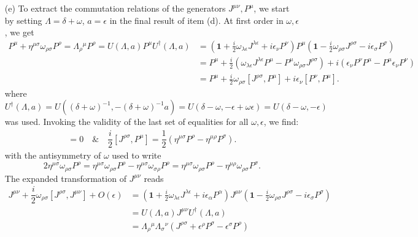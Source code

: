 \documentclass[10pt, a4paper]{article}
\begin{document}
\begin{enumerate}
  \item[(e)] To extract the commutation relations of the generators $J^{\mu \nu}, P^{\mu}$, we start by setting $\Lambda = \delta + \omega$, $a = \epsilon$ in the final result of item (d). At first order in $\omega, \epsilon$, we get
  \begin{align*}
    P^\mu + \eta^{\mu \sigma}\omega_{\rho \sigma} P^\rho = \Lambda_\rho{ }^\mu P^\rho = U(\Lambda, a) P^\mu U^{\dagger}(\Lambda, a) &= \left(\mathbf{1}+\frac{i}{2} \omega_{\lambda \epsilon} J^{\lambda \epsilon}+i \epsilon_\nu P^\nu\right) P^\mu \left(\mathbf{1}-\frac{i}{2} \omega_{\rho \sigma} J^{\rho \sigma}-i \epsilon_\sigma P^\sigma\right)\\
    &= P^\mu + \frac{i}{2} \left(\omega_{\lambda \epsilon} J^{\lambda \epsilon}P^{\mu} - P^{\mu} \omega_{\rho \sigma}  J^{\rho \sigma}\right)+i (\epsilon_\nu P^\nu P^\mu - P^\mu \epsilon_\nu P^\nu)\\
    &= P^\mu + \frac{i}{2} \omega_{\rho \sigma} [J^{\rho \sigma}, P^{\mu}]  +i \epsilon_\nu [P^{\nu}, P^{\mu}].
   \end{align*}
   where $U^{\dagger}(\Lambda, a) = U((\delta + \omega)^{-1}, -(\delta + \omega)^{-1} a) = U(\delta - \omega, -\epsilon + \omega \epsilon) = U(\delta - \omega, -\epsilon)$ was used. Invoking the validity of the last set of equalities for all $\omega, \epsilon$, we find: 
    \begin{align*}
      [P^{\nu}, P^{\mu}] = 0 \quad \& \quad \dfrac{i}{2}[J^{\rho \sigma}, P^{\mu}] =  \dfrac{1}{2}\left(\eta^{\mu \sigma}P^\rho- \eta^{\mu \rho} P^\sigma\right).
    \end{align*}
    with the antisymmetry of $\omega$ used to write $$2\eta^{\mu \sigma}\omega_{\rho \sigma} P^\rho = \eta^{\mu \sigma}\omega_{\rho \sigma} P^\rho - \eta^{\mu \sigma}\omega_{\sigma \rho} P^\rho = \eta^{\mu \sigma}\omega_{\rho \sigma} P^\rho - \eta^{\mu \rho}\omega_{\rho \sigma} P^\sigma. $$
    The expanded transformation of $J^{\mu\nu}$ reads 
    \begin{align*}
      J^{\mu \nu} + \dfrac{i}{2} \omega_{\rho\sigma} [J^{\rho \sigma}, J^{\mu \nu}] + O(\epsilon) &= \left(\mathbf{1}+\frac{i}{2} \omega_{\lambda \epsilon} J^{\lambda \epsilon}+i \epsilon_\alpha P^\alpha\right) J^{\mu \nu} \left(\mathbf{1}-\frac{i}{2} \omega_{\rho \sigma} J^{\rho \sigma}-i \epsilon_\sigma P^\sigma\right)\\
      &= U(\Lambda, a) J^{\mu\nu} U^{\dagger}(\Lambda, a)\\
      &= \Lambda_\rho{ }^\mu \Lambda_\sigma{ }^\nu\left(J^{\rho \sigma}+\epsilon^\rho P^\sigma-\epsilon^\sigma P^\rho\right) \\

\end{align*}
\end{enumerate}
\end{document}
